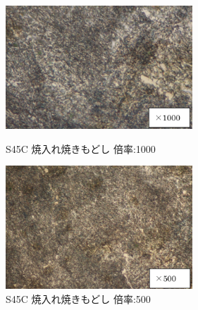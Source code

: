 \documentclass[10pt,a4j]{jsarticle}
\begin{document}
  \begin{figure}[htbp]
    \begin{minipage}{0.5\hsize}
      \begin{center}
        \includegraphics[width=7cm]{../img/S45C_yakiiremodoshi_1000.png}
        \caption{S45C 焼入れ焼きもどし 倍率:1000}
      \end{center}
    \end{minipage}
    \begin{minipage}{0.5\hsize}
      \begin{center}
        \includegraphics[width=7cm]{../img/S45C_yakiiremodoshi_500.png}
        \caption{S45C 焼入れ焼きもどし 倍率:500}
      \end{center}
    \end{minipage}
  \end{figure}
\end{document}
